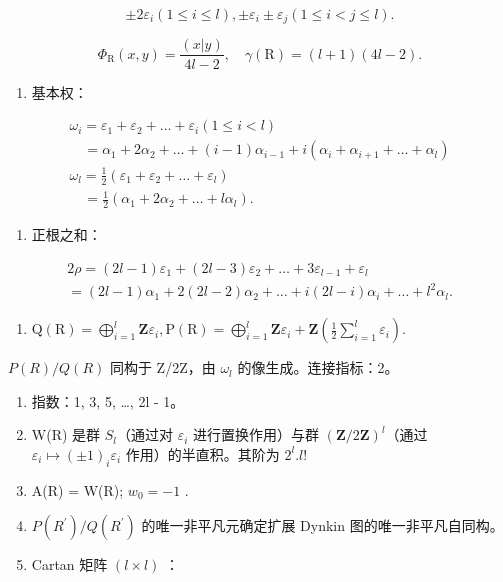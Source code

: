 \[
\pm 2 \varepsilon_ {i} (1 \leqslant i \leqslant l), \pm \varepsilon_ {i} \pm \varepsilon_ {j} (1 \leqslant i <   j \leqslant l).
\]

\[
\Phi_ {\mathrm{R}} (x, y) = \frac {(x | y)}{4 l - 2}, \quad \gamma (\mathrm{R}) = (l + 1) (4 l - 2).
\]

\begin{enumerate}
\def\labelenumi{(\Roman{enumi})}
\setcounter{enumi}{5}
\tightlist
\item
  基本权：
\end{enumerate}

\[
\begin{array}{l} \omega_ {i} = \varepsilon_ {1} + \varepsilon_ {2} + \dots + \varepsilon_ {i} (1 \leqslant i <   l) \\ \quad = \alpha_ {1} + 2 \alpha_ {2} + \dots + (i - 1) \alpha_ {i - 1} + i (\alpha_ {i} + \alpha_ {i + 1} + \dots + \alpha_ {l}) \\ \omega_ {l} = \frac {1}{2} (\varepsilon_ {1} + \varepsilon_ {2} + \dots + \varepsilon_ {l}) \\ \quad = \frac {1}{2} (\alpha_ {1} + 2 \alpha_ {2} + \dots + l \alpha_ {l}). \end{array}
\]

\begin{enumerate}
\def\labelenumi{(\Roman{enumi})}
\setcounter{enumi}{6}
\tightlist
\item
  正根之和：
\end{enumerate}

\[
\begin{array}{l} 2 \rho = (2 l - 1) \varepsilon_ {1} + (2 l - 3) \varepsilon_ {2} + \dots + 3 \varepsilon_ {l - 1} + \varepsilon_ {l} \\ = (2 l - 1) \alpha_ {1} + 2 (2 l - 2) \alpha_ {2} + \dots + i (2 l - i) \alpha_ {i} + \dots + l ^ {2} \alpha_ {l}. \end{array}
\]

\begin{enumerate}
\def\labelenumi{(\Roman{enumi})}
\setcounter{enumi}{7}
\tightlist
\item
  \(\mathrm{Q}(\mathrm{R}) = \bigoplus_{i=1}^{l}\mathbf{Z}\varepsilon_i,\mathrm{P}(\mathrm{R}) = \bigoplus_{i=1}^{l}\mathbf{Z}\varepsilon_i + \mathbf{Z}(\frac{1}{2}\sum_{i=1}^{l}\varepsilon_i).\)
\end{enumerate}

\(P(R)/Q(R)\) 同构于 Z/2Z，由 \(\omega_{l}\) 的像生成。连接指标：2。

\begin{enumerate}
\def\labelenumi{(\Roman{enumi})}
\setcounter{enumi}{8}
\item
  指数：1, 3, 5, \ldots, 2l - 1。
\item
  W(R) 是群 \(S_{l}\)（通过对 \(\varepsilon_{i}\) 进行置换作用）与群 \((\mathbf{Z}/2\mathbf{Z})^{l}\)（通过 \(\varepsilon_{i} \mapsto (\pm1)_{i}\varepsilon_{i}\) 作用）的半直积。其阶为 \(2^{l}.l!\)
\item
  A(R) = W(R); \(w_{0} = -1\) .
\item
  \(P(R^{\prime})/Q(R^{\prime})\) 的唯一非平凡元确定扩展 Dynkin 图的唯一非平凡自同构。
\item
  Cartan 矩阵 \((l \times l)\) ：
\end{enumerate}

